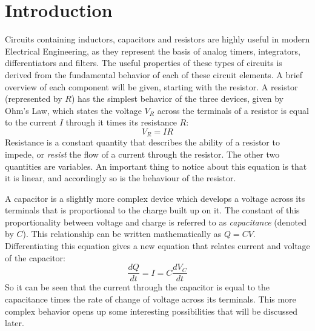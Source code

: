 \documentclass[12pt]{article}
\begin{document}
\section{Introduction}
Circuits containing inductors, capacitors and resistors are highly useful in modern Electrical Engineering, as they represent the basis of analog timers, integrators, differentiators and filters. The useful properties of these types of circuits is derived from the fundamental behavior of each of these circuit elements. A brief overview of each component will be given, starting with the resistor. A resistor (represented by $R$) has the simplest behavior of the three devices, given by Ohm's Law, which states the voltage $V_R$ across the terminals of a resistor is equal to the current $I$ through it times its resistance $R$:
\begin{equation}
V_R = IR
\end{equation}
Resistance is a constant quantity that describes the ability of a resistor to impede, or \textit{resist} the flow of a current through the resistor. The other two quantities are variables. An important thing to notice about this equation is that it is linear, and accordingly so is the behaviour of the resistor.\par\vspace{12pt}
%
A capacitor is a slightly more complex device which develops a voltage across its terminals that is proportional to the charge built up on it. The constant of this proportionality between voltage and charge is referred to as \textit{capacitance} (denoted by $C$). This relationship can be written mathematically as $Q=CV$. Differentiating this equation gives a new equation that relates current and voltage of the capacitor:
\begin{equation}
\frac{dQ}{dt} = I = C \frac{dV_C}{dt}
\end{equation}
So it can be seen that the current through the capacitor is equal to the capacitance times the rate of change of voltage across its terminals. This more complex behavior opens up some interesting possibilities that will be discussed later.\par\vspace{12pt}
\end{document}
